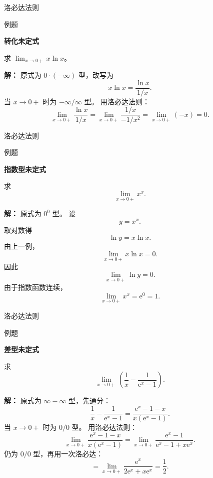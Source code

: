 \documentclass[aspectratio=169,10pt,fontset=fandol]{ctexbeamer}
\newcommand{\ee}{\mathrm{e}}
\begin{document}
\begin{frame}[t,fragile]{洛必达法则}
\normalsize
\begin{block}{例题}
{\normalsize
\textbf{转化未定式}\par

求 $\displaystyle\lim_{x\to0+}x\ln x$。

}
\end{block}
\pause
{\normalsize
\textbf{解：}
原式为 $0\cdot(-\infty)$ 型，改写为
\[
x\ln x=\frac{\ln x}{1/x}.
\]
当 $x\to0+$ 时为 $-\infty/\infty$ 型。 用洛必达法则：
\[
\lim_{x\to0+}\frac{\ln x}{1/x}
=\lim_{x\to0+}\frac{1/x}{-1/x^2}
=\lim_{x\to0+}(-x)=0.
\]

}
\end{frame}
\begin{frame}[t,fragile]{洛必达法则}
\footnotesize
\begin{block}{例题}
{\footnotesize
\textbf{指数型未定式}\par

求
\[
\lim_{x\to0+}x^x.
\]

}
\end{block}
\pause
{\footnotesize
\textbf{解：}
原式为 $0^0$ 型。 设
\[
y=x^x.
\]
取对数得
\[
\ln y=x\ln x.
\]
由上一例，
\[
\lim_{x\to0+}x\ln x=0.
\]
因此
\[
\lim_{x\to0+}\ln y=0.
\]
由于指数函数连续，
\[
\lim_{x\to0+}x^x=\ee^0=1.
\]

}
\end{frame}
\begin{frame}[t,fragile]{洛必达法则}
\small
\begin{block}{例题}
{\small
\textbf{差型未定式}\par

求
\[
\lim_{x\to0+}\left(\frac1x-\frac1{\ee^x-1}\right).
\]

}
\end{block}
\pause
{\small
\textbf{解：}
原式为 $\infty-\infty$ 型，先通分：
\[
\frac1x-\frac1{\ee^x-1}
=\frac{\ee^x-1-x}{x(\ee^x-1)}.
\]
当 $x\to0+$ 时为 $0/0$ 型。 用洛必达法则：
\[
\lim_{x\to0+}\frac{\ee^x-1-x}{x(\ee^x-1)}
=\lim_{x\to0+}\frac{\ee^x-1}{\ee^x-1+x\ee^x}.
\]
仍为 $0/0$ 型，再用一次洛必达：
\[
=\lim_{x\to0+}\frac{\ee^x}{2\ee^x+x\ee^x}
=\frac12.
\]

}
\end{frame}
\end{document}
